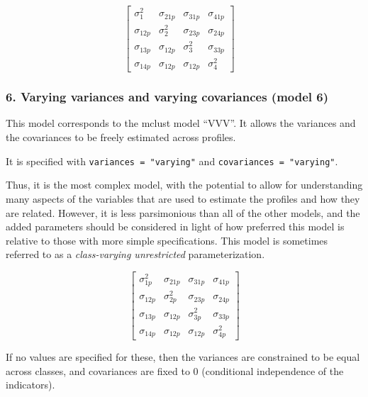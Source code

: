 \documentclass[man]{apa6}
\begin{document}
\[
\left[ \begin{matrix} { \sigma  }_{ 1 }^{ 2 } & { \sigma  }_{ 21p } & { \sigma  }_{ 31p } & { \sigma  }_{ 41p } \\ { \sigma  }_{ 12p } & { \sigma  }_{ 2 }^{ 2 } & { \sigma  }_{ 23p } & { \sigma  }_{ 24p } \\ { \sigma  }_{ 13p } & { \sigma  }_{ 12p } & { \sigma  }_{ 3 }^{ 2 } & { \sigma  }_{ 33p } \\ { \sigma  }_{ 14p } & { \sigma  }_{ 12p } & { \sigma  }_{ 12p } & { \sigma  }_{ 4 }^{ 2 } \end{matrix} \right] \quad 
\]

\hypertarget{varying-variances-and-varying-covariances-model-6}{%
\subsubsection{6. Varying variances and varying covariances (model 6)}\label{varying-variances-and-varying-covariances-model-6}}

This model corresponds to the mclust model \enquote{VVV}. It allows the variances and the covariances to be freely estimated across profiles.

It is specified with \texttt{variances\ =\ "varying"} and \texttt{covariances\ =\ "varying"}.

Thus, it is the most complex model, with the potential to allow for understanding many aspects of the variables that are used to estimate the profiles and how they are related. However, it is less parsimonious than all of the other models, and the added parameters should be considered in light of how preferred this model is relative to those with more simple specifications. This model is sometimes referred to as a \emph{class-varying unrestricted} parameterization.

\[
\left[ \begin{matrix} { \sigma  }_{ 1p }^{ 2 } & { \sigma  }_{ 21p } & { \sigma  }_{ 31p } & { \sigma  }_{ 41p } \\ { \sigma  }_{ 12p } & { \sigma  }_{ 2p }^{ 2 } & { \sigma  }_{ 23p } & { \sigma  }_{ 24p } \\ { \sigma  }_{ 13p } & { \sigma  }_{ 12p } & { \sigma  }_{ 3p }^{ 2 } & { \sigma  }_{ 33p } \\ { \sigma  }_{ 14p } & { \sigma  }_{ 12p } & { \sigma  }_{ 12p } & { \sigma  }_{ 4p }^{ 2 } \end{matrix} \right] 
\]

If no values are specified for these, then the variances are constrained to be
equal across classes, and covariances are fixed to 0 (conditional independence
of the indicators).
\end{document}
